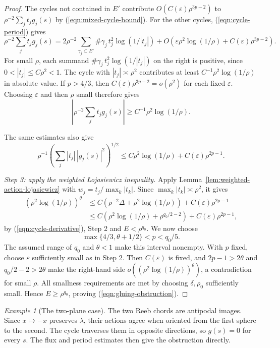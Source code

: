 \documentclass[11pt,a4paper]{article}
\numberwithin{equation}{section}
\theoremstyle{definition}
\theoremstyle{remark}
\newtheorem{example}[theorem]{Example}
\begin{document}
\begin{proof}
		The cycles not contained in $E'$ contribute $O(C(\varepsilon)\rho^{3p-2})$ to
		$\rho^{-2}\sum_jt_jg_j(s)$ by
		(\ref{eqn:mixed-cycle-bound}). For the other cycles,
		(\ref{eqn:cycle-period}) gives
		\[
		\rho^{-2}\sum_jt_jg_j(s)
		=2\rho^{-2}\sum_{\gamma_j\subset E'}\#\gamma_j\,t_j^2\log(1/|t_j|)
		+O\!\left(\varepsilon\rho^2\log(1/\rho)+C(\varepsilon)\rho^{3p-2}\right).
		\]
		For small $\rho$, each summand $\#\gamma_j\,t_j^2\log(1/|t_j|)$ on the right
		is positive, since $0<|t_j|\le C\rho^2<1$.
		The cycle with $|t_j|\asymp\rho^2$
		contributes at least $C^{-1}\rho^2\log(1/\rho)$ in absolute value.
		If $p>4/3$, then $C(\varepsilon)\rho^{3p-2}=o(\rho^2)$
		for each fixed $\varepsilon$. Choosing $\varepsilon$ and then $\rho$
		small therefore gives
		\[
		\left|\rho^{-2}\sum_jt_jg_j(s)\right|
		\ge C^{-1}\rho^2\log(1/\rho).
		\]
		
		The same estimates also give
		\[
		\rho^{-1}\left(\sum_j|t_j|\,|g_j(s)|^2\right)^{1/2}
		\le C\rho^2\log(1/\rho)+C(\varepsilon)\rho^{2p-1}.
		\]
		
		\smallskip
		\noindent\emph{Step 3: apply the weighted \L{}ojasiewicz inequality.}
		Apply Lemma~\ref{lem:weighted-action-lojasiewicz} with
		$w_j=t_j/\max_k|t_k|$. Since $\max_k|t_k|\asymp\rho^2$, it gives
		\[
		\begin{aligned}
			(\rho^2\log(1/\rho))^\theta
			&\le C\left(\rho^{-2}\Delta+\rho^2\log(1/\rho)\right)
			+C(\varepsilon)\rho^{2p-1}\\
			&\le C\left(\rho^2\log(1/\rho)+\rho^{q_0/2-2}\right)
			+C(\varepsilon)\rho^{2p-1},
		\end{aligned}
		\]
		by (\ref{eqn:cycle-derivative}), Step 2 and $E<\rho^{q_0}$.
		We now choose
		\[
		\max\{4/3,\theta+1/2\}<p<q_0/5.
		\]
		The assumed range of $q_0$ and $\theta<1$ make this interval nonempty.
		With $p$ fixed, choose $\varepsilon$ sufficiently small as in Step 2.
		Then $C(\varepsilon)$ is fixed, and $2p-1>2\theta$ and
		$q_0/2-2>2\theta$ make the right-hand side
		$o((\rho^2\log(1/\rho))^\theta)$, a contradiction for small $\rho$.
		All smallness requirements are met by choosing $\delta,\rho_0$ sufficiently small.
		Hence $E\ge\rho^{q_0}$, proving
		(\ref{eqn:gluing-obstruction}).
	\end{proof}
	
	\begin{example}[The two-plane case]\label{ex:antipodal-cancellation}
		The two Reeb chords are antipodal images. Since $x\mapsto-x$ preserves
		$\lambda$, their actions agree
		when oriented from the first sphere to the second. The cycle traverses
		them in opposite directions, so $g(s)=0$ for every $s$. The flux and
		period estimates then give the obstruction directly.
	\end{example}
	
\end{document}
